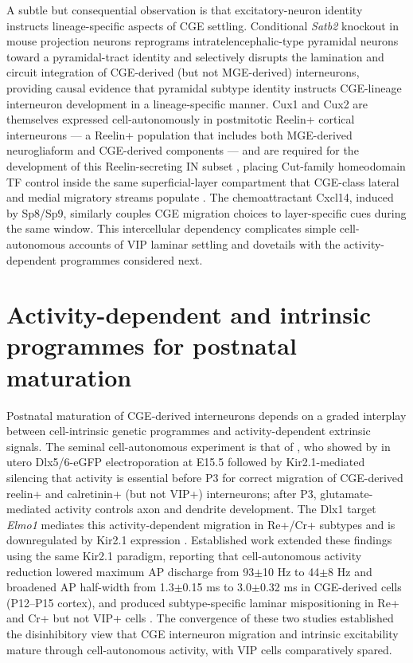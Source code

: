 \documentclass[11pt]{article}
\begin{document}
A subtle but consequential observation is that excitatory-neuron identity instructs lineage-specific aspects of CGE settling. Conditional \textit{Satb2} knockout in mouse projection neurons reprograms intratelencephalic-type pyramidal neurons toward a pyramidal-tract identity and selectively disrupts the lamination and circuit integration of CGE-derived (but not MGE-derived) interneurons, providing causal evidence that pyramidal subtype identity instructs CGE-lineage interneuron development in a lineage-specific manner. Cux1 and Cux2 are themselves expressed cell-autonomously in postmitotic Reelin+ cortical interneurons --- a Reelin+ population that includes both MGE-derived neurogliaform and CGE-derived components --- and are required for the development of this Reelin-secreting IN subset \citep{Cubelos2008}, placing Cut-family homeodomain TF control inside the same superficial-layer compartment that CGE-class lateral and medial migratory streams populate \citep{Touzot2016}. The chemoattractant Cxcl14, induced by Sp8/Sp9, similarly couples CGE migration choices to layer-specific cues during the same window. This intercellular dependency complicates simple cell-autonomous accounts of VIP laminar settling and dovetails with the activity-dependent programmes considered next.

\section{Activity-dependent and intrinsic programmes for postnatal maturation}

Postnatal maturation of CGE-derived interneurons depends on a graded interplay between cell-intrinsic genetic programmes and activity-dependent extrinsic signals. The seminal cell-autonomous experiment is that of \citet{Demarcogarcia2011}, who showed by in utero Dlx5/6-eGFP electroporation at E15.5 followed by Kir2.1-mediated silencing that activity is essential before P3 for correct migration of CGE-derived reelin+ and calretinin+ (but not VIP+) interneurons; after P3, glutamate-mediated activity controls axon and dendrite development. The Dlx1 target \textit{Elmo1} mediates this activity-dependent migration in Re+/Cr+ subtypes and is downregulated by Kir2.1 expression \citep{Demarcogarcia2011}. Established work extended these findings using the same Kir2.1 paradigm, reporting that cell-autonomous activity reduction lowered maximum AP discharge from 93$\pm$10 Hz to 44$\pm$8 Hz and broadened AP half-width from 1.3$\pm$0.15 ms to 3.0$\pm$0.32 ms in CGE-derived cells (P12--P15 cortex), and produced subtype-specific laminar mispositioning in Re+ and Cr+ but not VIP+ cells \citep{Karayannis2012}. The convergence of these two studies established the disinhibitory view that CGE interneuron migration and intrinsic excitability mature through cell-autonomous activity, with VIP cells comparatively spared.
\end{document}
